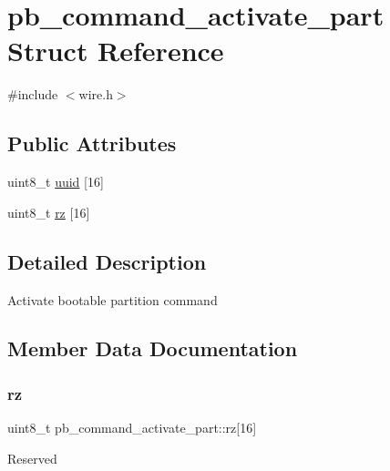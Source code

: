 \hypertarget{structpb__command__activate__part}{}\section{pb\+\_\+command\+\_\+activate\+\_\+part Struct Reference}
\label{structpb__command__activate__part}


{\ttfamily \#include $<$wire.\+h$>$}

\subsection*{Public Attributes}
\begin{DoxyCompactItemize}
\item 
uint8\+\_\+t \hyperlink{structpb__command__activate__part_a872a2ee6ae1edf5f06589a228776c02e}{uuid} \mbox{[}16\mbox{]}
\item 
uint8\+\_\+t \hyperlink{structpb__command__activate__part_aa4ffcb89615bc2b29e05e5676ee10cc0}{rz} \mbox{[}16\mbox{]}
\end{DoxyCompactItemize}


\subsection{Detailed Description}
Activate bootable partition command 

\subsection{Member Data Documentation}
\mbox{\label{structpb__command__activate__part_aa4ffcb89615bc2b29e05e5676ee10cc0}} 
\subsubsection{\texorpdfstring{rz}{rz}}
{\footnotesize\ttfamily uint8\+\_\+t pb\+\_\+command\+\_\+activate\+\_\+part\+::rz\mbox{[}16\mbox{]}}

Reserved \mbox{\label{structpb__command__activate__part_a872a2ee6ae1edf5f06589a228776c02e}} 
